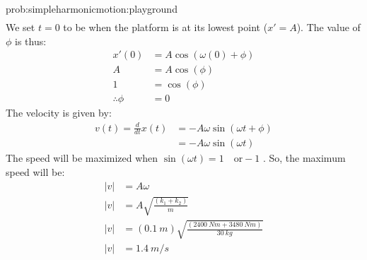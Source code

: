 \begin{solution}{prob:simpleharmonicmotion:playground}
\begin{align*}
\end{align*}
We set $t=0$ to be when the platform is at its lowest point ($x'=A$). The value of $\phi$ is thus:
\begin{align*}
x'(0)&= A \cos(\omega (0) + \phi)\\
A&= A \cos(\phi)\\
1&=\cos(\phi)\\
\therefore \phi&=0
\end{align*}
The velocity is given by:
\begin{align*}
v(t)=\frac{d}{dt}x(t) &= -A\omega\sin(\omega t + \phi)\\
&=-A\omega\sin(\omega t)
\end{align*}
The speed will be maximized when $\sin(\omega t)=1\quad \textrm{or} -1$ . So, the maximum speed will be:
\begin{align*}
|v|&=A\omega\\
|v|&=A\sqrt{\frac{(k_1+k_2)}{m}}\\
|v|&=(\SI{0.1}{m})\sqrt{\frac{(\SI{2400}{Nm}+\SI{3480}{Nm})}{\SI{30}{kg}}}\\
|v|&=\SI{1.4}{m/s}
\end{align*}
\end{solution}

